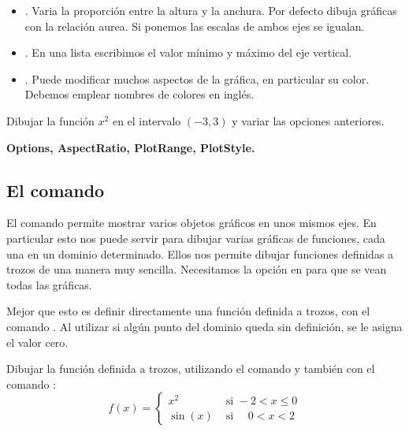 \documentclass[a4paper,10pt, draft]{article}
\newcommand{\com}[1]{\textbf{\color{blue}{#1}}}
\newenvironment{ejer}{\begin{tcolorbox}[center title, title=Ejercicios,
fonttitle=\sffamily\bfseries,colback=blue!5,colframe=orange]}{\end{tcolorbox}}
\newenvironment{funciones}{\begin{tcolorbox}[center title, title=Nuevas funciones, fonttitle=\sffamily\bfseries, colback=green!5!white,colframe=red!75!black]}{\end{tcolorbox}\bigskip}
\begin{document}
\begin{itemize}

\item \com{AspectRatio}. Varia la proporción entre la altura y la anchura. Por defecto dibuja gráficas con la relación aurea. Si ponemos \com{Automatic} las escalas de ambos ejes se igualan.

\item \com{PlotRange}. En una lista escribimos el valor mínimo y máximo del eje vertical.

\item \com{PlotStyle}. Puede modificar muchos aspectos de la gráfica, en particular su color. Debemos emplear nombres de colores en inglés. 


\end{itemize}

\begin{ejer}

Dibujar la función $x^2$ en el intervalo $(-3,3)$ y variar las opciones anteriores.



\end{ejer} 

\begin{funciones}

\textbf{Options, AspectRatio, PlotRange, PlotStyle.}

\end{funciones}




\newpage


\subsection{El comando \com{Show}}

El comando \com{Show[a]} permite mostrar varios objetos gráficos en unos mismos ejes. En particular esto nos puede servir para dibujar varias gráficas de funciones, cada una en un dominio determinado. Ellos nos permite dibujar funciones definidas a trozos de una manera muy sencilla. Necesitamos la opción \com{PlotRange} en \com{All} para que se vean todas las gráficas.

Mejor que esto es definir directamente una función definida a trozos, con el comando \com{Piecewise[lista]}. Al utilizar \com{Piecewise} si algún punto del dominio queda sin definición, se le asigna el valor cero.

\begin{ejer}

Dibujar la función definida a trozos, utilizando el comando \com{Show} y también con el comando \com{Piecewise}:
$$
f(x)=
\begin{cases}
x^2 & \textrm{ si } -2<x\leq 0\\
\sin(x) & \textrm{ si  } \quad 0<x<2
\end{cases}
$$



\end{ejer}
\end{document}

